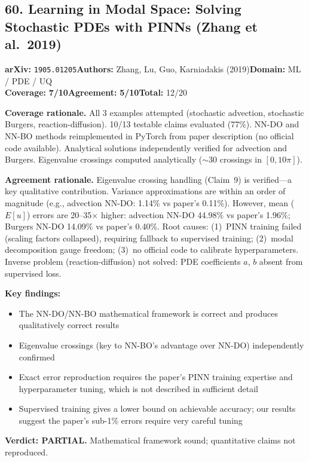 \documentclass[11pt]{article}
\newcommand{\scorebadge}[2]{\textbf{#1:} \textbf{#2/10}}
\begin{document}
\subsection{60. Learning in Modal Space: Solving Stochastic PDEs with PINNs (Zhang et al.\ 2019)}
\textbf{arXiv:} \texttt{1905.01205}\quad\textbf{Authors:} Zhang, Lu, Guo, Karniadakis (2019)\quad\textbf{Domain:} ML / PDE / UQ\\
\scorebadge{Coverage}{7}\quad\scorebadge{Agreement}{5}\quad\textbf{Total:} 12/20\par\smallskip
\noindent\textbf{Coverage rationale.} All 3 examples attempted (stochastic advection, stochastic Burgers, reaction-diffusion). 10/13 testable claims evaluated (77\%). NN-DO and NN-BO methods reimplemented in PyTorch from paper description (no official code available). Analytical solutions independently verified for advection and Burgers. Eigenvalue crossings computed analytically ($\sim$30 crossings in $[0,10\pi]$).\par
\noindent\textbf{Agreement rationale.} Eigenvalue crossing handling (Claim~9) is verified---a key qualitative contribution. Variance approximations are within an order of magnitude (e.g., advection NN-DO: 1.14\% vs paper's 0.11\%). However, mean ($E[u]$) errors are 20--35$\times$ higher: advection NN-DO 44.98\% vs paper's 1.96\%; Burgers NN-DO 14.09\% vs paper's 0.40\%. Root causes: (1)~PINN training failed (scaling factors collapsed), requiring fallback to supervised training; (2)~modal decomposition gauge freedom; (3)~no official code to calibrate hyperparameters. Inverse problem (reaction-diffusion) not solved: PDE coefficients $a$, $b$ absent from supervised loss.\par\smallskip
\noindent\textbf{Key findings:}
\begin{itemize}[leftmargin=1.4em,itemsep=0.2em,topsep=0.2em]
\item The NN-DO/NN-BO mathematical framework is correct and produces qualitatively correct results
\item Eigenvalue crossings (key to NN-BO's advantage over NN-DO) independently confirmed
\item Exact error reproduction requires the paper's PINN training expertise and hyperparameter tuning, which is not described in sufficient detail
\item Supervised training gives a lower bound on achievable accuracy; our results suggest the paper's sub-1\% errors require very careful tuning
\end{itemize}
\noindent\textbf{Verdict: PARTIAL.} Mathematical framework sound; quantitative claims not reproduced.
\end{document}
